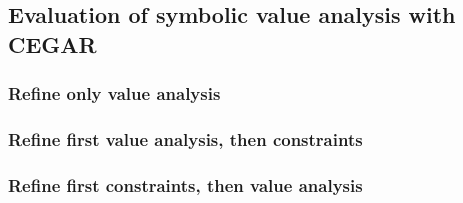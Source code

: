 \subsection{Evaluation of symbolic value analysis with CEGAR}
\subsubsection{Refine only value analysis}
\subsubsection{Refine first value analysis, then constraints}
\subsubsection{Refine first constraints, then value analysis}
